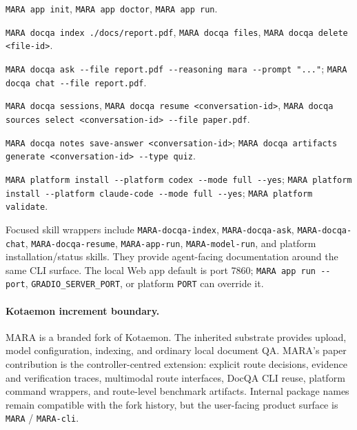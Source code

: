 \begin{small}
\begin{description}[leftmargin=0pt,labelindent=0pt,style=nextline,itemsep=2pt,topsep=2pt]
    \item[App lifecycle] \texttt{MARA app init}, \texttt{MARA app doctor}, \texttt{MARA app run}.
    \item[DocQA indexing] \texttt{MARA docqa index ./docs/report.pdf}, \texttt{MARA docqa files}, \texttt{MARA docqa delete \textless file-id\textgreater}.
    \item[DocQA answering] \texttt{MARA docqa ask -{}-file report.pdf -{}-reasoning mara -{}-prompt "..."}; \texttt{MARA docqa chat -{}-file report.pdf}.
    \item[Sessions and sources] \texttt{MARA docqa sessions}, \texttt{MARA docqa resume \textless conversation-id\textgreater}, \texttt{MARA docqa sources select \textless conversation-id\textgreater{} -{}-file paper.pdf}.
    \item[Notes and artifacts] \texttt{MARA docqa notes save-answer \textless conversation-id\textgreater}; \texttt{MARA docqa artifacts generate \textless conversation-id\textgreater{} -{}-type quiz}.
    \item[Agent support assets] \texttt{MARA platform install -{}-platform codex -{}-mode full -{}-yes}; \texttt{MARA platform install -{}-platform claude-code -{}-mode full -{}-yes}; \texttt{MARA platform validate}.
\end{description}
\end{small}

{\raggedright
Focused skill wrappers include \texttt{MARA-docqa-index}, \texttt{MARA-docqa-ask}, \texttt{MARA-docqa-chat}, \texttt{MARA-docqa-resume}, \texttt{MARA-app-run}, \texttt{MARA-model-run}, and platform installation/status skills. They provide agent-facing documentation around the same CLI surface. The local Web app default is port 7860; \texttt{MARA app run -{}-port}, \texttt{GRADIO\_SERVER\_PORT}, or platform \texttt{PORT} can override it.
\par}

\paragraph{Kotaemon increment boundary.}

MARA is a branded fork of Kotaemon. The inherited substrate provides upload, model configuration, indexing, and ordinary local document QA. MARA's paper contribution is the controller-centred extension: explicit route decisions, evidence and verification traces, multimodal route interfaces, DocQA CLI reuse, platform command wrappers, and route-level benchmark artifacts. Internal package names remain compatible with the fork history, but the user-facing product surface is \texttt{MARA} / \texttt{MARA-cli}.

